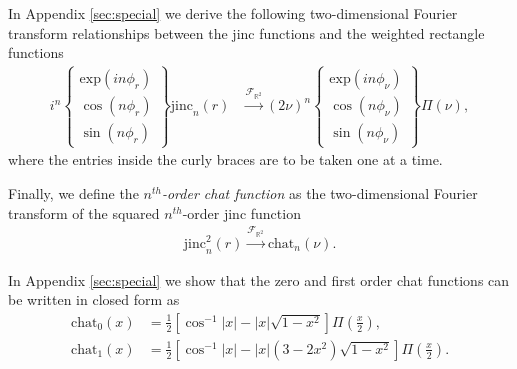 \documentclass[]{osa-article}
\providecommand{\mbb}[1]{\mathbb{#1}}
\begin{document}
In Appendix \ref{sec:special} we derive the following two-dimensional Fourier
transform relationships between the jinc functions and the weighted rectangle
functions
\begin{align}
  i^{n}\left\{\substack{
  \text{exp}(in\phi_r)\\
    \cos(n\phi_r)\\
    \sin(n\phi_r)
  }\right\}\text{jinc}_n(r) &\stackrel{\mathcal{F}_{\mbb{R}^2}}{\longrightarrow} (2\nu)^{n}\left\{\substack{
    \text{exp}(in\phi_{\nu})\\
    \cos(n\phi_{\nu})\\
    \sin(n\phi_{\nu})
  }\right\}\Pi(\nu), \label{eq:jincrect2}
  \end{align}
where the entries inside the curly braces are to be taken one at a time. 
  
Finally, we define the \textit{$n^{th}$-order chat function} as the
two-dimensional Fourier transform of the squared $n^{th}$-order jinc function
\begin{align}
  \text{jinc}_n^2(r) \stackrel{\mathcal{F}_{\mbb{R}^2}}{\longrightarrow} \text{chat}_n(\nu).
\end{align}

In Appendix \ref{sec:special} we show that the zero and first order chat
functions can be written in closed form as
\begin{align}
  \text{chat}_0(x) &=  \frac{1}{2}\left[\cos^{-1}|x| - |x|\sqrt{1 - x^2}\right]\Pi\left(\frac{x}{2}\right),\\
  \text{chat}_1(x) &=  \frac{1}{2}\left[\cos^{-1}|x| - |x|(3-2x^2)\sqrt{1 - x^2}\right]\Pi\left(\frac{x}{2}\right).  
\end{align}
\end{document}
